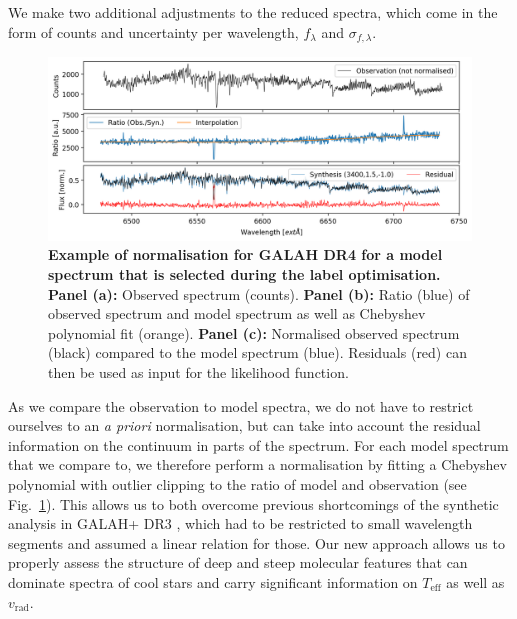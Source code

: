 \documentclass[
  journal=pasa,
  manuscript=research-paper, %
  year=2023,
  volume=37
]{cup-journal}
\newcommand{\SB}[1]{{\textcolor{purple}{#1}}}
\newcommand{\Teff}{$T_\mathrm{eff}$\xspace}
\newcommand{\logg}{$\log g$\xspace}
\newcommand{\feh}{$\mathrm{[Fe/H]}$\xspace}
\newcommand{\vrad}{$v_\mathrm{rad}$\xspace}
\newcommand{\TheCannon}{\textit{The Cannon}\xspace}
\newcommand{\dex}{\,\mathrm{dex}}	%
\newcommand{\K}{\,\mathrm{K}}	%
\begin{document}
We make two additional adjustments to the reduced spectra, which come in the form of counts and uncertainty per wavelength, $f_\lambda$ and $\sigma_{f,\lambda}$.

\begin{figure}[ht]
\centering
\includegraphics[width=\textwidth]{figures/Nuisance_example.png}
\caption{
\textbf{Example of normalisation for GALAH DR4 for a model spectrum that is selected during the label optimisation.}
\textbf{Panel (a):} Observed spectrum (counts).
\textbf{Panel (b):} Ratio (blue) of observed spectrum and model spectrum as well as Chebyshev polynomial fit (orange).
\textbf{Panel (c):} Normalised observed spectrum (black) compared to the model spectrum (blue). Residuals (red) can then be used as input for the likelihood function.
}
\label{fig:ratio_normalisation}
\end{figure}

As we compare the observation to model spectra, we do not have to restrict ourselves to an \textit{a priori} normalisation, but can take into account the residual information on the continuum in parts of the spectrum. For each model spectrum that we compare to, we therefore perform a normalisation by fitting a Chebyshev polynomial with outlier clipping to the ratio of model and observation (see Fig.~\ref{fig:ratio_normalisation}). This allows us to both overcome previous shortcomings of the synthetic analysis in GALAH+ DR3 \citep{Buder2021}, which had to be restricted to small wavelength segments and assumed a linear relation for those. Our new approach allows us to properly assess the structure of deep and steep molecular features that can dominate spectra of cool stars and carry significant information on \Teff as well as \vrad.

\end{document}
